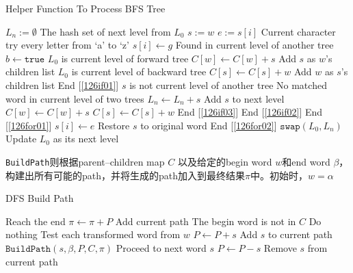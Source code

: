 \begin{algorithm}[H]
\caption{Helper Function To Process BFS Tree}
\begin{algorithmic}[1]
\State $L_n:=\emptyset$ \Comment The hash set of next level from $L_0$
\State $s:=w$ 
 \label{126for02}
\State $e:=s[i]$ \Comment Current character
 \Comment try every letter from `a' to `z' \label{126for01}
\State $s[i]\gets g$
 \Comment Found in current level of another tree \label{126if02}
\State $b\gets \texttt{true}$
 \Comment $L_0$ is current level of forward tree \label{126if01}
\State $C[w]\gets C[w] + s$ \Comment Add $s$ as $w$'s children list
\Else \Comment $L_0$ is current level of backward tree
\State $C[s]\gets C[s] + w$ \Comment Add $w$ as $s$'s children list
\EndIf \Comment End [\ref{126if01}]
\Else \Comment $s$ is not current level of another tree
 \Comment No matched word in current level of two trees \label{126if03}
\State $L_n\gets L_n+s$ \Comment Add $s$ to next level
\State $C[w]\gets C[w] + s$ 
\Else 
\State $C[s]\gets C[s] + w$ 
\EndIf 
\EndIf \Comment End [\ref{126if03}]
\EndIf \Comment End [\ref{126if02}]
\EndFor \Comment End [\ref{126for01}]
\State $s[i]\gets e$ \Comment Restore $s$ to original word 
\EndFor \Comment End [\ref{126for02}]
\EndFor
\State $\texttt{swap}(L_0, L_n)$ \Comment Update $L_0$ as its next level
\EndFunction
\end{algorithmic}
\end{algorithm}
\begin{CJK*}{UTF8}{gbsn}
\texttt{BuildPath}则根据parent--children map $C$ 以及给定的begin word $w$和end word $\beta$，构建出所有可能的path，并将生成的path加入到最终结果$\pi$中。初始时，$w=\alpha$
\end{CJK*}
\begin{algorithm}[H]
\caption{DFS Build Path}
\begin{algorithmic}[1]
 \Comment Reach the end
\State $\pi\gets \pi + P$ \Comment Add current path
\State \Return
\EndIf
{} \Comment The begin word is not in $C$
\State \Return \Comment Do nothing
\EndIf
{} \Comment Test each transformed word from $w$
\State $P\gets P + s$ \Comment Add $s$ to current path
\State $\texttt{BuildPath}(s, \beta, P, C, \pi)$ \Comment Proceed to next word $s$
\State $P\gets P - s$ \Comment Remove $s$ from current path
\EndFor
\EndFunction
\end{algorithmic}
\end{algorithm}